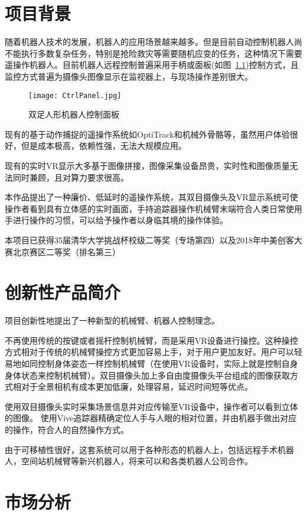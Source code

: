 \chapter{项目背景}

随着机器人技术的发展，机器人的应用场景越来越多。但是目前自动控制机器人尚不能执行多数复杂任务，特别是抢险救灾等需要随机应变的任务，这种情况下需要遥操作机器人。目前机器人远程控制普遍采用手柄或面板(如图~\ref{panal})控制方式，且监控方式普遍为摄像头图像显示在监视器上，与现场操作差别很大。

\begin{figure}[htbp]
\centering
\texttt{[image: CtrlPanel.jpg]}
\caption{双足人形机器人控制面板} 
\label{panal}
\end{figure}

现有的基于动作捕捉的遥操作系统如OptiTrack和机械外骨骼等，虽然用户体验很好，但是成本极高，依赖性强，无法大规模应用。

现有的实时VR显示大多基于图像拼接，图像采集设备昂贵，实时性和图像质量无法同时兼顾，且对算力要求很高。

本作品提出了一种廉价、低延时的遥操作系统，其双目摄像头及VR显示系统可使操作者看到具有立体感的实时画面，手持追踪器操作机械臂末端符合人类日常使用手进行操作的习惯，可以给予操作者以身临其境的操作体验。

本项目已获得35届清华大学挑战杯校级二等奖（专场第四）以及2018年中美创客大赛北京赛区二等奖（排名第三）

\chapter{创新性产品简介}

项目创新性地提出了一种新型的机械臂、机器人控制理念。

不再使用传统的按键或者摇杆控制机械臂，而是采用VR设备进行操控。这种操控方式相对于传统的机械臂操控方式更加容易上手，对于用户更加友好。用户可以轻易地如同控制身体姿态一样控制机械臂（在使用VR设备时，实际上就是控制自身身体状态来控制机械臂）。双目摄像头加上多自由度摄像头平台组成的图像获取方式相对于全景相机有成本更加低廉，处理容易，延迟时间短等优点。

使用双目摄像头实时采集场景信息并对应传输至VR设备中，操作者可以看到立体的图像。
使用Vive追踪器精确定位人手与人眼的相对位置，并由机器手做出对应的操作，符合人的自然操作方式。

由于可移植性很好，这套系统可以用于各种形态的机器人上，包括远程手术机器人，空间站机械臂等新兴机器人，将来可以和各类机器人公司合作。

\chapter{市场分析}


